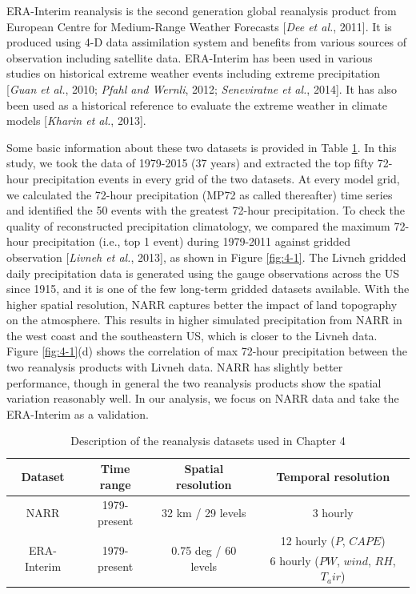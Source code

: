 ERA-Interim reanalysis is the second generation global reanalysis product from European Centre for Medium-Range Weather Forecasts [\textit{Dee et al.}, 2011]. It is produced using 4-D data assimilation system and benefits from various sources of observation including satellite data. ERA-Interim has been used in various studies on historical extreme weather events including extreme precipitation [\textit{Guan et al.}, 2010; \textit{Pfahl and Wernli}, 2012; \textit{Seneviratne et al.}, 2014]. It has also been used as a historical reference to evaluate the extreme weather in climate models [\textit{Kharin et al.}, 2013].

Some basic information about these two datasets is provided in Table \ref{table:4-1}. In this study, we took the data of 1979-2015 (37 years) and extracted the top fifty 72-hour precipitation events in every grid of the two datasets. At every model grid, we calculated the 72-hour precipitation (MP72 as called thereafter) time series and identified the 50 events with the greatest 72-hour precipitation. To check the quality of reconstructed precipitation climatology, we compared the maximum 72-hour precipitation (i.e., top 1 event) during 1979-2011 against gridded observation [\textit{Livneh et al.}, 2013], as shown in Figure \ref{fig:4-1}. The Livneh gridded daily precipitation data is generated using the gauge observations across the US since 1915, and it is one of the few long-term gridded datasets available. With the higher spatial resolution, NARR captures better the impact of land topography on the atmosphere. This results in higher simulated precipitation from NARR in the west coast and the southeastern US, which is closer to the Livneh data. Figure \ref{fig:4-1}(d) shows the correlation of max 72-hour precipitation between the two reanalysis products with Livneh data. NARR has slightly better performance, though in general the two reanalysis products show the spatial variation reasonably well. In our analysis, we focus on NARR data and take the ERA-Interim as a validation.

\begin{table}[htbp]
	\centering
	\caption{Description of the reanalysis datasets used in Chapter 4}
	\begin{tabular}{cccc}
		\hline
		Dataset & Time range & Spatial resolution & Temporal resolution\\
		\hline
		NARR  & 1979-present  & 32 km / 29 levels  & 3 hourly\\
		\hline
		\multirow{2}{*}{ERA-Interim} & \multirow{2}{*}{1979-present}  & \multirow{2}{*}{0.75 deg / 60 levels}  & 12 hourly ($P$, $CAPE$)\\
		& & & 6 hourly ($PW$, $wind$, $RH$, $T_air$)\\
		\hline
	\end{tabular}
	\label{table:4-1}
\end{table}

